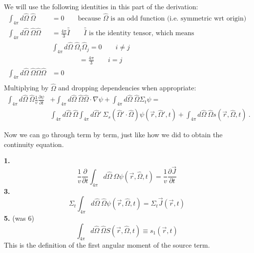 \documentclass[12pt]{article}
\newcommand{\vOmega}{\ensuremath{\hat{\Omega}}}
\begin{document}
We will use the following identities in this part of the derivation:
\begin{align*} 
\int_{4\pi} d\vOmega \:\vOmega &= 0 \qquad \text{because }\vOmega\text{ is an odd function (i.e. symmetric wrt origin)} \\
%
\int_{4\pi} d\vOmega\: \vOmega \vOmega &= \frac{4\pi}{3}\bar{\bar{I}} \qquad \bar{\bar{I}}\text{ is the identity tensor, which means} \\
%
&\int_{4\pi} d\vOmega\: \vOmega_i \vOmega_j = 0 \qquad i \neq j \nonumber \\
&\qquad \qquad = \frac{4\pi}{3} \qquad i = j \nonumber \\
%
\int_{4\pi} d\vOmega \: \vOmega \vOmega \vOmega &= 0 \qquad \\
\end{align*}
%
Multiplying by $\vOmega$ and dropping dependencies when appropriate:
%
\begin{align*}
\int_{4\pi} d\vOmega\: \vOmega \frac{1}{v}\frac{\partial \psi}{\partial t} &+ 
\int_{4\pi} d\vOmega\: \vOmega \vOmega \cdot \nabla \psi + 
\int_{4\pi} d\vOmega\: \vOmega \Sigma_t \psi =\nonumber \\
&\int_{4\pi} d\vOmega\: \vOmega \int_{4\pi} d\vOmega'\: \Sigma_s(\vOmega' \cdot \vOmega) \psi(\vec{r}, \vOmega', t) +
\int_{4\pi} d\vOmega\: \vOmega s(\vec{r}, \vOmega, t)\:.
\end{align*}

Now we can go through term by term, just like how we did to obtain the continuity equation.

\textbf{1.}
\begin{equation}
\frac{1}{v}\frac{\partial}{\partial t} \int_{4\pi} d\vOmega\: \vOmega \psi(\vec{r}, \vOmega, t) = \boxed{\frac{1}{v}\frac{\partial \vec{J}}{\partial t}} \nonumber
\end{equation}
\textbf{3.} 
\begin{equation}
\Sigma_t \int_{4\pi} d\vOmega\: \vOmega \psi(\vec{r}, \vOmega, t) = \boxed{\Sigma_t  \vec{J}(\vec{r}, t)} \nonumber
\end{equation}
\textbf{5.} (was 6)
\begin{equation}
\int_{4\pi} d\vOmega\: \vOmega S(\vec{r}, \vOmega, t) \equiv \boxed{s_{1}(\vec{r}, t)}  \nonumber
\end{equation}
This is the definition of the first angular moment of the source term. 
\end{document}
